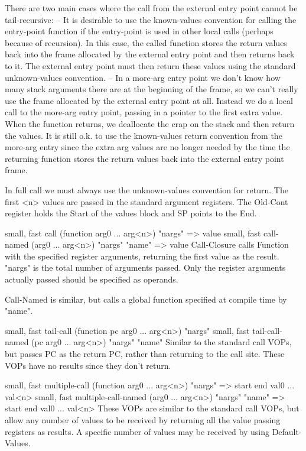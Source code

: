 {\begin{itemize, spread 0, spacing 1}
There are two main cases where the call from the external entry point cannot be
tail-recursive:
 -- It is desirable to use the known-values convention for calling the
    entry-point function if the entry-point is used in other local calls
    (perhaps because of recursion).  In this case, the called function stores
    the return values back into the frame allocated by the external entry point
    and then returns back to it.  The external entry point must then return
    these values using the standard unknown-values convention.
 -- In a more-arg entry point we don't know how many stack arguments there are
    at the beginning of the frame, so we can't really use the frame allocated
    by the external entry point at all.  Instead we do a local call to the
    more-arg entry point, passing in a pointer to the first extra value.  When
    the function returns, we deallocate the crap on the stack and then return
    the values.  It is still o.k. to use the known-values return convention
    from the more-arg entry since the extra arg values are no longer needed by
    the time the returning function stores the return values back into the
    external entry point frame.


In full call we must always use the unknown-values convention for return.  The
first <n> values are passed in the standard argument registers.  The Old-Cont
register holds the Start of the values block and SP points to the End.


{small, fast} call (function arg0 ... arg<n>) "nargs" => value
{small, fast} call-named (arg0 ... arg<n>) "nargs" "name" => value
    Call-Closure calls Function with the specified register arguments,
    returning the first value as the result.  "nargs" is the total number of
    arguments passed.  Only the register arguments actually passed should be
    specified as operands.

    Call-Named is similar, but calls a global function specified at compile
    time by "name".

{small, fast} tail-call (function pc arg0 ... arg<n>) "nargs"
{small, fast} tail-call-named (pc arg0 ... arg<n>) "nargs" "name"
    Similar to the standard call VOPs, but passes PC as the return PC, rather
    than returning to the call site.  These VOPs have no results since they
    don't return.

{small, fast} multiple-call (function arg0 ... arg<n>) "nargs"
                                    => start end val0 ... val<n>
{small, fast} multiple-call-named (arg0 ... arg<n>) "nargs" "name"
                                  => start end val0 ... val<n>
    These VOPs are similar to the standard call VOPs, but allow any number of 
    values to be received by returning all the value passing registers as
    results.  A specific number of values may be received by using
    Default-Values. 


\end{itemize, spread 0, spacing 1}}
